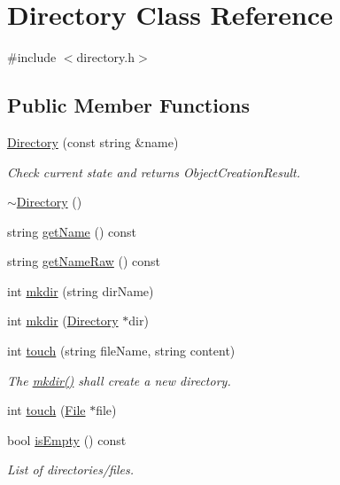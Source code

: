 \hypertarget{class_directory}{}\section{Directory Class Reference}
\label{class_directory}


{\ttfamily \#include $<$directory.\+h$>$}

\subsection*{Public Member Functions}
\begin{DoxyCompactItemize}
\item 
\hyperlink{class_directory_a0b019225671a50ead8dbb22b97667676}{Directory} (const string \&name)
\begin{DoxyCompactList}\small\item\em Check current state and returns Object\+Creation\+Result. \end{DoxyCompactList}\item 
\hyperlink{class_directory_affbde8714685c61601421097d621341d}{$\sim$\+Directory} ()
\item 
string \hyperlink{class_directory_adfb3c1b9b65ca47aaef4c91fb44adf83}{get\+Name} () const
\item 
string \hyperlink{class_directory_ac9641eabb49e810239d66bcc99bb8e98}{get\+Name\+Raw} () const
\item 
int \hyperlink{class_directory_adfec0eb4ee88844c1483363b14543e92}{mkdir} (string dir\+Name)
\item 
int \hyperlink{class_directory_a02a77fbbfda041d430ec4d6f78ba8618}{mkdir} (\hyperlink{class_directory}{Directory} $\ast$dir)
\item 
int \hyperlink{class_directory_abe82fee2bf7d59d277133848d8c9833d}{touch} (string file\+Name, string content)
\begin{DoxyCompactList}\small\item\em The \hyperlink{class_directory_adfec0eb4ee88844c1483363b14543e92}{mkdir()} shall create a new directory. \end{DoxyCompactList}\item 
int \hyperlink{class_directory_ab78fbd1a38c3e9f3926372f9fb2ccf5e}{touch} (\hyperlink{class_file}{File} $\ast$file)
\item 
bool \hyperlink{class_directory_a5d3efa22fedc9f37963b2217e60beb3c}{is\+Empty} () const
\begin{DoxyCompactList}\small\item\em List of directories/files. \end{DoxyCompactList}\item 

\end{DoxyCompactItemize}
